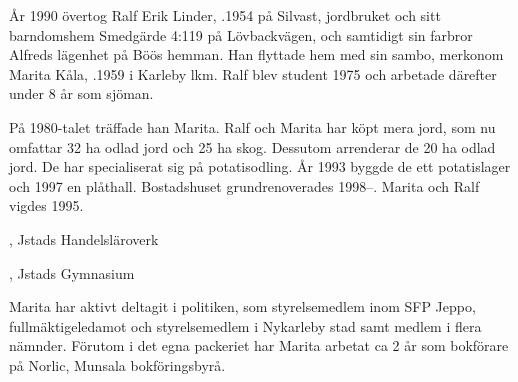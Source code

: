 
År 1990 övertog Ralf Erik Linder, .1954 på Silvast, jordbruket och sitt barndomshem Smedgärde 4:119 på Lövbackvägen, och samtidigt sin farbror Alfreds lägenhet på Böös hemman. Han flyttade hem med sin sambo, merkonom Marita Kåla, .1959 i Karleby lkm. Ralf blev student 1975 och arbetade därefter under 8 år som sjöman.

På 1980-talet träffade han Marita. Ralf och Marita har köpt mera jord, som nu omfattar 32 ha odlad jord och 25 ha skog. Dessutom arrenderar de 20 ha odlad jord. De har specialiserat sig på potatisodling. År 1993 byggde de ett potatislager och 1997 en plåthall. Bostadshuset grundrenoverades 1998--. Marita och Ralf vigdes 1995.
\begin{jhchildren}
  \item {}, Jstads Handelsläroverk
  \item {}, Jstads Gymnasium
\end{jhchildren}
Marita har aktivt deltagit i politiken, som styrelsemedlem inom SFP Jeppo, fullmäktigeledamot och styrelsemedlem i Nykarleby stad samt medlem i flera nämnder. Förutom i det egna packeriet har Marita arbetat ca 2 år som bokförare på Norlic, Munsala bokföringsbyrå.


